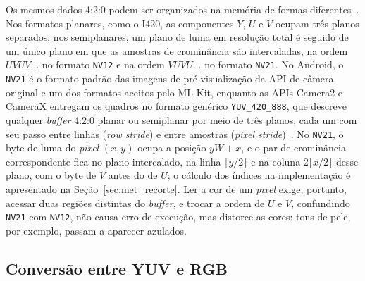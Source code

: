 Os mesmos dados 4:2:0 podem ser organizados na memória de formas diferentes~\cite{android_imageformat}. Nos formatos planares, como o I420, as componentes $Y$, $U$ e $V$ ocupam três planos separados; nos semiplanares, um plano de luma em resolução total é seguido de um único plano em que as amostras de crominância são intercaladas, na ordem $UVUV\ldots$ no formato \texttt{NV12} e na ordem $VUVU\ldots$ no formato \texttt{NV21}. No Android, o \texttt{NV21} é o formato padrão das imagens de pré-visualização da API de câmera original e um dos formatos aceitos pelo ML Kit, enquanto as APIs Camera2 e CameraX entregam os quadros no formato genérico \texttt{YUV\_420\_888}, que descreve qualquer \textit{buffer} 4:2:0 planar ou semiplanar por meio de três planos, cada um com seu passo entre linhas (\textit{row stride}) e entre amostras (\textit{pixel stride})~\cite{android_imageformat}. No \texttt{NV21}, o byte de luma do \textit{pixel} $(x, y)$ ocupa a posição $yW + x$, e o par de crominância correspondente fica no plano intercalado, na linha $\lfloor y/2 \rfloor$ e na coluna $2\lfloor x/2 \rfloor$ desse plano, com o byte de $V$ antes do de $U$; o cálculo dos índices na implementação é apresentado na Seção~\ref{sec:met_recorte}. Ler a cor de um \textit{pixel} exige, portanto, acessar duas regiões distintas do \textit{buffer}, e trocar a ordem de $U$ e $V$, confundindo \texttt{NV21} com \texttt{NV12}, não causa erro de execução, mas distorce as cores: tons de pele, por exemplo, passam a aparecer azulados.

\subsection{Conversão entre YUV e RGB} \label{sec:conversao_cores}


